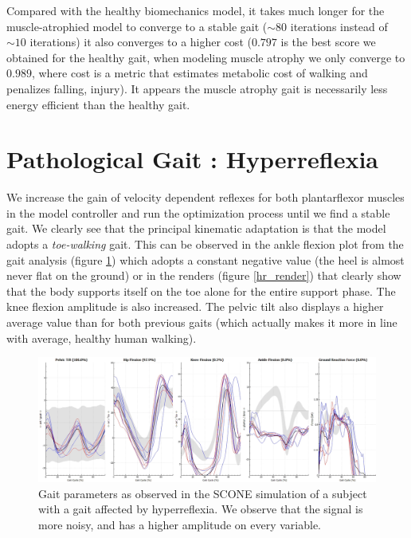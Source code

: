 \documentclass[11pt]{article}
\begin{document}
Compared with the healthy biomechanics model, it takes much longer for the muscle-atrophied model to converge to a stable gait ($\sim 80$ iterations instead of $\sim 10$ iterations) it also converges to a higher cost ($0.797$ is the best score we obtained for the healthy gait, when modeling muscle atrophy we only converge to $0.989$, where cost is a metric that estimates metabolic cost of walking and penalizes falling, injury). It appears the muscle atrophy gait is necessarily less energy efficient than the healthy gait.

\section{Pathological Gait : Hyperreflexia}

We increase the gain of velocity dependent reflexes for both plantarflexor muscles in the model controller and run the optimization process until we find a stable gait. We clearly see that the principal kinematic adaptation is that the model adopts a \textit{toe-walking} gait. This can be observed in the ankle flexion plot  from the gait analysis (figure \ref{hr_gait}) which adopts a constant negative value (the heel is almost never flat on the ground) or in the renders (figure \ref{hr_render}) that clearly show that the body supports itself on the toe alone for the entire support phase. The knee flexion amplitude is also increased. The pelvic tilt also displays a higher average value than for both previous gaits (which actually makes it more in line with average, healthy human walking).

\begin{figure}[h!]
    \centering
    \includegraphics[width=\textwidth]{screens/hyperreflexia_gait.png}
    \caption{Gait parameters as observed in the SCONE simulation of a subject with a gait affected by hyperreflexia. We observe that the signal is more noisy, and has a higher amplitude on every variable. }
    \label{hr_gait}
\end{figure}
\end{document}
